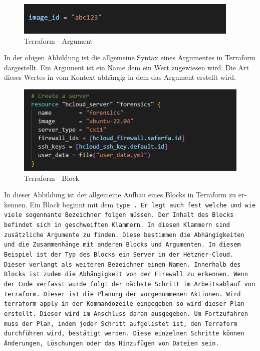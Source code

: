 \begin{otherlanguage}{ngerman}
\newline
\begin{figure}[h]
    \centering
    \includegraphics{LaTeX/graphic/TFArg.png}
    \caption{Terraform - Argument}
\end{figure}
\newline
In der obigen Abbildung ist die allgemeine Syntax eines Argumentes in Terraform dargestellt. Ein Argument ist ein Name dem ein Wert zugewiesen wird. Die Art dieses Wertes in vom Kontext abhängig in dem das Argument erstellt wird.
\begin{figure}[h]
    \centering
    \includegraphics{LaTeX/graphic/TFBlock.png}
    \caption{Terraform - Block}
\end{figure}
\newline
\newline
In dieser Abbildung ist der allgemeine Aufbau eines Blocks in Terraform zu erkennen. Ein Block beginnt mit dem \tt type \rm . Er legt auch fest welche und wie viele sogennante Bezeichner folgen müssen. Der Inhalt des Blocks befindet sich in geschweiften Klammern. In diesen Klammern sind zusätzliche Argumente zu finden. Diese bestimmen die Abhängigkeiten und die Zusammenhänge mit anderen Blocks und Argumenten. In diesem Beispiel ist der Typ des Blocks ein Server in der \dq Hetzner-Cloud\dq{}. Dieser verlangt als weiteren Bezeichner einen Namen. Innerhalb des Blocks ist zudem die Abhängigkeit von der Firewall zu erkennen.
\newline
Wenn der Code verfasst wurde folgt der nächste Schritt im Arbeitsablauf von Terraform. Dieser ist die Planung der vorgenommenen Aktionen. Wird \tt terraform apply \rm in der Kommandozeile eingegeben so wird dieser Plan erstellt. Dieser wird im Anschluss daran ausgegeben. Um Fortzufahren muss der Plan, indem jeder Schritt aufgelistet ist, den Terraform durchführen wird, bestätigt werden. Diese einzelnen Schritte können Änderungen, Löschungen oder das Hinzufügen von Dateien sein.

\end{otherlanguage}
